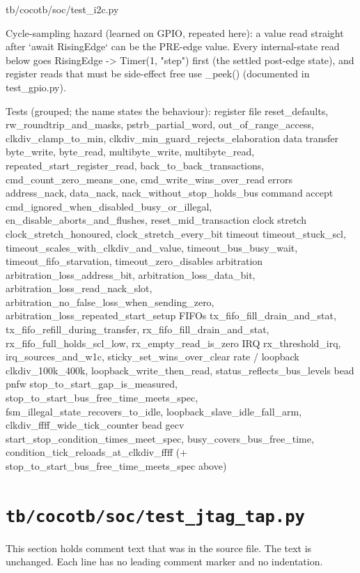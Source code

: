 \begin{relocated}{tb/cocotb/soc/test_i2c.py}
\begin{textblock}
Cycle-sampling hazard (learned on GPIO, repeated here): a value read straight after
`await RisingEdge` can be the PRE-edge value.  Every internal-state read below goes
RisingEdge -> Timer(1, "step") first (the settled post-edge state), and register reads that must
be side-effect free use _peek() (documented in test_gpio.py).

Tests (grouped; the name states the behaviour):
register file   reset_defaults, rw_roundtrip_and_masks, pstrb_partial_word, out_of_range_access,
clkdiv_clamp_to_min, clkdiv_min_guard_rejects_elaboration
data transfer   byte_write, byte_read, multibyte_write, multibyte_read,
repeated_start_register_read,
back_to_back_transactions, cmd_count_zero_means_one, cmd_write_wins_over_read
errors          address_nack, data_nack, nack_without_stop_holds_bus
command accept  cmd_ignored_when_disabled_busy_or_illegal, en_disable_aborts_and_flushes,
reset_mid_transaction
clock stretch   clock_stretch_honoured, clock_stretch_every_bit
timeout         timeout_stuck_scl, timeout_scales_with_clkdiv_and_value, timeout_bus_busy_wait,
timeout_fifo_starvation, timeout_zero_disables
arbitration     arbitration_loss_address_bit, arbitration_loss_data_bit,
arbitration_loss_read_nack_slot, arbitration_no_false_loss_when_sending_zero,
arbitration_loss_repeated_start_setup
FIFOs           tx_fifo_fill_drain_and_stat, tx_fifo_refill_during_transfer,
rx_fifo_fill_drain_and_stat, rx_fifo_full_holds_scl_low, rx_empty_read_is_zero
IRQ             rx_threshold_irq, irq_sources_and_w1c, sticky_set_wins_over_clear
rate / loopback clkdiv_100k_400k, loopback_write_then_read, status_reflects_bus_levels
bead pnfw       stop_to_start_gap_is_measured, stop_to_start_bus_free_time_meets_spec,
fsm_illegal_state_recovers_to_idle,
loopback_slave_idle_fall_arm, clkdiv_ffff_wide_tick_counter
bead gecv       start_stop_condition_times_meet_spec, busy_covers_bus_free_time,
condition_tick_reloads_at_clkdiv_ffff
(+ stop_to_start_bus_free_time_meets_spec above)
\end{textblock}

\end{relocated}

\section{\texttt{tb/cocotb/soc/test\_jtag\_tap.py}}\label{tm:suite:soc-test-jtag-tap}

This section holds comment text that was in the source file. The text is unchanged. Each line has no leading comment marker and no indentation.

